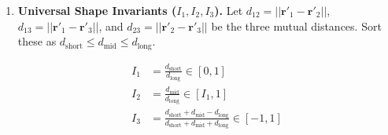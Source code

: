 \documentclass{article}
\newcommand{\authcomment}[1]{\textcolor{Red}{\textbf{[#1]}}}
\begin{document}
\begin{enumerate}
    \item \textbf{Universal Shape Invariants ($I_1, I_2, I_3$).}
    Let $d_{12} = ||\mathbf{r}'_1 - \mathbf{r}'_2||$, $d_{13} = ||\mathbf{r}'_1 - \mathbf{r}'_3||$, and $d_{23} = ||\mathbf{r}'_2 - \mathbf{r}'_3||$ be the three mutual distances. Sort these as $d_{\text{short}} \leq d_{\text{mid}} \leq d_{\text{long}}$.

    \begin{align}
    I_1 &= \frac{d_{\text{short}}}{d_{\text{long}}} \in [0, 1] \\
    I_2 &= \frac{d_{\text{mid}}}{d_{\text{long}}} \in [I_1, 1] \\
    I_3 &= \frac{d_{\text{short}} + d_{\text{mid}} - d_{\text{long}}}{d_{\text{short}} + d_{\text{mid}} + d_{\text{long}}} \in [-1, 1]
    \end{align}

\end{enumerate}
\end{document}
